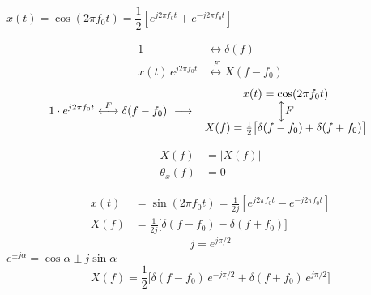 \documentclass[11pt,a4paper]{article}
\begin{document}
\begin{ornek}
$x(t)=\cos(2\pi f_0t)=\dfrac12\left[e^{j2\pi f_0t}+e^{-j2\pi f_0t}\right]$
\end{ornek}
\begin{align*}
1&\longleftrightarrow\delta(f)\\
x(t)\,e^{j2\pi f_0t}&\overset{F}{\longleftrightarrow}X(f-f_0)
\end{align*}
\[
1\cdot e^{j2\pi f_0t}\overset{F}{\longleftrightarrow}\delta(f-f_0)\ \longrightarrow\ 
\begin{array}{c}x(t)=\cos(2\pi f_0t)\\ \Big\updownarrow F\\ X(f)=\tfrac12\bigl[\delta(f-f_0)+\delta(f+f_0)\bigr]\end{array}
\]


\begin{align*}
X(f)&=|X(f)|\\
\theta_x(f)&=0
\end{align*}
\begin{center}
\end{center}

\begin{align*}
x(t)&=\sin(2\pi f_0t)=\frac{1}{2j}\left[e^{j2\pi f_0t}-e^{-j2\pi f_0t}\right]\\
X(f)&=\frac{1}{2j}\bigl[\delta(f-f_0)-\delta(f+f_0)\bigr]
\end{align*}
\[
j=e^{j\pi/2}
\]
\textcolor{kirmizikalem}{$e^{\pm j\alpha}=\cos\alpha\pm j\sin\alpha$}
\[
X(f)=\frac12\bigl[\delta(f-f_0)\,e^{-j\pi/2}+\delta(f+f_0)\,e^{j\pi/2}\bigr]
\]
\end{document}
